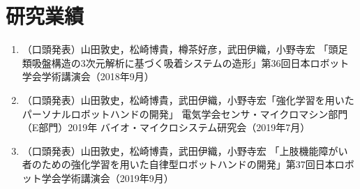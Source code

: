 \chapter{研究業績}

\begin{enumerate}\setlength{\itemsep}{10pt}
    
    \item （口頭発表）山田敦史，松崎博貴，樽茶好彦，武田伊織，小野寺宏 「頭足類吸盤構造の3次元解析に基づく吸着システムの造形」第36回日本ロボット学会学術講演会（2018年9月）
    
    \item （口頭発表）山田敦史，松崎博貴，武田伊織，小野寺宏「強化学習を用いたパーソナルロボットハンドの開発」 電気学会センサ・マイクロマシン部門（E部門）2019年 バイオ・マイクロシステム研究会（2019年7月）
    
    \item （口頭発表）山田敦史，松崎博貴，武田伊織，小野寺宏 「上肢機能障がい者のための強化学習を用いた自律型ロボットハンドの開発」第37回日本ロボット学会学術講演会（2019年9月）
    
\end{enumerate}